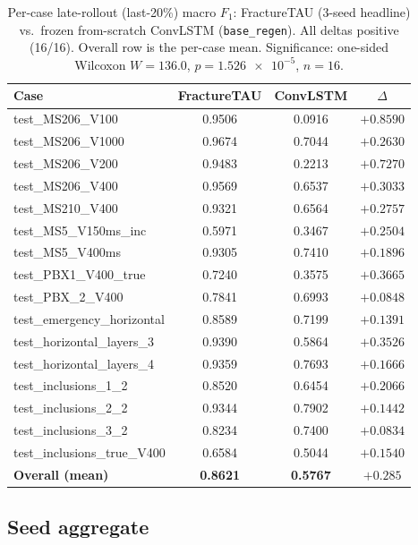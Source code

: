 \documentclass[11pt]{article}
\begin{document}
\begin{table}[t]
\centering
\caption{Per-case late-rollout (last-20\%) macro $F_1$: FractureTAU (3-seed
headline) vs.\ frozen from-scratch ConvLSTM (\texttt{base\_regen}). All deltas
positive (16/16). Overall row is the per-case mean. Significance: one-sided
Wilcoxon $W{=}136.0$, $p{=}\num{1.526e-5}$, $n{=}16$.}
\label{tab:headline}
\small
\begin{tabular}{lccc}
\toprule
Case & FractureTAU & ConvLSTM & $\Delta$ \\
\midrule
test\_MS206\_V100            & 0.9506 & 0.0916 & $+0.8590$ \\
test\_MS206\_V1000           & 0.9674 & 0.7044 & $+0.2630$ \\
test\_MS206\_V200            & 0.9483 & 0.2213 & $+0.7270$ \\
test\_MS206\_V400            & 0.9569 & 0.6537 & $+0.3033$ \\
test\_MS210\_V400            & 0.9321 & 0.6564 & $+0.2757$ \\
test\_MS5\_V150ms\_inc       & 0.5971 & 0.3467 & $+0.2504$ \\
test\_MS5\_V400ms            & 0.9305 & 0.7410 & $+0.1896$ \\
test\_PBX1\_V400\_true       & 0.7240 & 0.3575 & $+0.3665$ \\
test\_PBX\_2\_V400           & 0.7841 & 0.6993 & $+0.0848$ \\
test\_emergency\_horizontal  & 0.8589 & 0.7199 & $+0.1391$ \\
test\_horizontal\_layers\_3  & 0.9390 & 0.5864 & $+0.3526$ \\
test\_horizontal\_layers\_4  & 0.9359 & 0.7693 & $+0.1666$ \\
test\_inclusions\_1\_2       & 0.8520 & 0.6454 & $+0.2066$ \\
test\_inclusions\_2\_2       & 0.9344 & 0.7902 & $+0.1442$ \\
test\_inclusions\_3\_2       & 0.8234 & 0.7400 & $+0.0834$ \\
test\_inclusions\_true\_V400 & 0.6584 & 0.5044 & $+0.1540$ \\
\midrule
\textbf{Overall (mean)}      & \textbf{0.8621} & \textbf{0.5767} & $\mathbf{+0.285}$ \\
\bottomrule
\end{tabular}
\end{table}

\subsection{Seed aggregate}
\label{sec:seeds}
\end{document}

